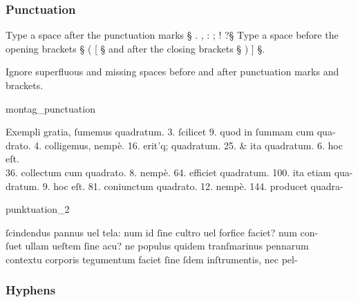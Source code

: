 \subsubsection{Punctuation}
\label{section latin punctuation}

\begin{mainrule}
Type a space after the punctuation marks § . , : ; ! ?§ \quad
Type a space before the opening brackets § ( [ § and after the closing brackets  § ) ] §.
\end{mainrule}

\begin{clarification}
Ignore superfluous and missing spaces before and after punctuation marks and brackets.
\end{clarification}

\vspace{2mm}
\begin{sampleImage}{montag_punctuation}
\begin{typeLatin}
Exempli gratia, ſumemus quadratum. \bold{_}3\bold{_}. ſcilicet 9. quod in ſummam cum qua-\\
drato. 4. colligemus, nempè. 1\bold{_}6\bold{_}. erit\bs'q; quadratum. 25. & ita quadratum. 6. hoc eſt.\\
\bold{_}36\bold{_}. collectum cum quadrato. 8. nempè. \bold{_}6\bold{_}4. efficiet quadratum. 100. ita etiam qua-\\
dratum. \bold{_}9\bold{_}. hoc eſt. 81. coniunctum quadrato. 12. nempè. 144. producet quadra- \\
\someText {}
\end{typeLatin}
\end{sampleImage}

\begin{sampleImage}{punktuation_2}
\begin{typeLatin}
 \someText
ſcindendus pannus uel tela: num id ſine cultro uel forfice faciet? num con-\\
ſuet ullam ueſtem ſine acu? ne populus quidem tranſmarinus pennarum\\
contextu corporis tegumentum faciet ſine ſdem inſtrumentis, nec pel-\\
\someText {}
\end{typeLatin}
\end{sampleImage}


\subsubsection{Hyphens}
\label{section hyphens}

